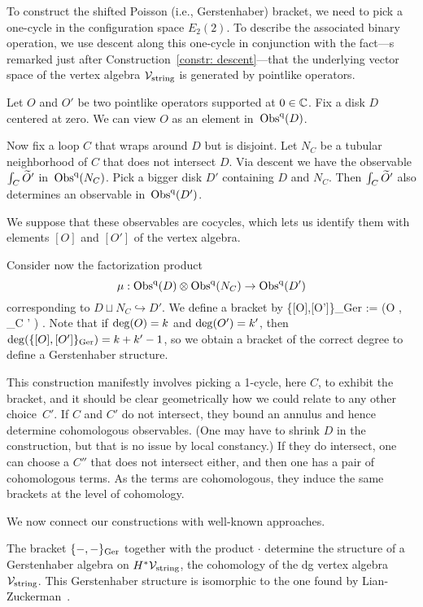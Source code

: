 To construct the shifted Poisson (i.e., Gerstenhaber) bracket, 
we need to pick a one-cycle in the configuration space $E_2(2)$.
To describe the associated binary operation, 
we use descent along this one-cycle
in conjunction with the fact---s remarked just after Construction~\ref{constr: descent}---that
the underlying vector space of the vertex algebra $\cV_{\rm string}$ is generated by pointlike operators.

Let $O$ and $O'$ be two pointlike operators supported at $0 \in \CC$. 
Fix a disk $D$ centered at zero.
We can view $O$ as an element in~$\Obs^\q(D)$.

Now fix a loop $C$ that wraps around $D$ but is disjoint.
Let $N_{C}$ be a tubular neighborhood of $C$ that does not intersect $D$. 
Via descent we have the observable $\int_C \Tilde{O}'$ in~$\Obs^\q(N_C)$. 
Pick a bigger disk $D'$ containing $D$ and $N_C$.
Then $\int_C \Tilde{O}'$ also determines an observable in~$\Obs^\q(D')$. 

We suppose that these observables are cocycles, 
which lets us identify them with elements $[O]$ and $[O']$ of the vertex algebra.

Consider now the factorization product
\[
\mu : \Obs^\q(D) \tensor \Obs^\q (N_{C}) \to \Obs^\q(D')
\] 
corresponding to $D \sqcup N_C \hookrightarrow D'$. 
We define a bracket by 
\ben
\{[O],[O']\}_{\rm Ger} := \mu \left(O , \int_{C} ' \right) .
\een 
Note that if ${\rm deg}(O) = k$ and ${\rm deg}(O') = k'$, then ${\rm deg}(\{[O],[O']\}_{\rm Ger}) = k+k' -1$, 
so we obtain a bracket of the correct degree to define a Gerstenhaber structure. 

\begin{rmk}
This construction manifestly involves picking a 1-cycle, here $C$, to exhibit the bracket, 
and it should be clear geometrically how we could relate to any other choice~$C'$.
If $C$ and $C'$ do not intersect, they bound an annulus and hence determine cohomologous observables.
(One may have to shrink $D$ in the construction, but that is no issue by local constancy.)
If they do intersect, one can choose a $C''$ that does not intersect either, and then one has a pair of cohomologous terms.
As the terms are cohomologous, they induce the same brackets at the level of cohomology.
\end{rmk}

We now connect our constructions with well-known approaches.

\begin{prop} 
The bracket $\{-,-\}_{\rm Ger}$ together with the product $\cdot$ determine the structure of a Gerstenhaber algebra on $H^* \cV_{\rm string}$, 
the cohomology of the dg vertex algebra $\cV_{\rm string}$. 
This Gerstenhaber structure is isomorphic to the one found by Lian-Zuckerman~\cite{LZ1}.
\end{prop}

